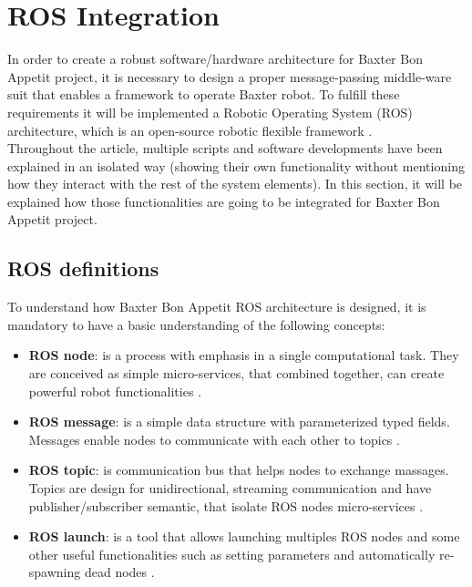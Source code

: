 \documentclass[11pt]{report} %
\begin{document}
\chapter{ROS Integration}

In order to create a robust software/hardware architecture for Baxter Bon Appetit project, it is necessary to design a proper message-passing middle-ware suit that enables a framework to operate Baxter robot. To fulfill these requirements it will be implemented a Robotic Operating System (ROS) architecture, which is an open-source robotic flexible framework \citep{cite_about_ros}.\\

Throughout the article, multiple scripts and software developments have been explained in an isolated way (showing their own functionality without mentioning how they interact with the rest of the system elements). In this section, it will be explained how those functionalities are going to be integrated for Baxter Bon Appetit project.\\

\section{ROS definitions}
To understand how Baxter Bon Appetit ROS architecture is designed, it is mandatory to have a basic understanding of the following concepts:

\begin{itemize}
    \item \textbf{ROS node}: is a process with emphasis in a single computational task. They are conceived as simple micro-services, that combined together, can create powerful robot functionalities \citep{cite_ros_node}.
    \item \textbf{ROS message}: is a simple data structure with parameterized typed fields. Messages enable nodes to communicate with each other to topics \citep{cite_ros_message}.
    \item \textbf{ROS topic}: is communication bus that helps nodes to exchange massages. Topics are design for unidirectional, streaming communication and have publisher/subscriber semantic, that isolate ROS nodes micro-services \citep{cite_ros_topic}.
    \item \textbf{ROS launch}: is a tool that allows launching multiples ROS nodes and some other useful functionalities such as setting parameters and automatically re-spawning dead nodes \citep{cite_ros_launch}. 
\end{itemize}
\end{document}
